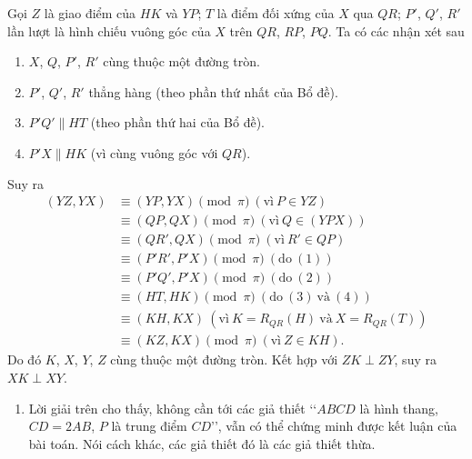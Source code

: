 \begin{bt}
{\begin{center}
		\end{center}
		Gọi $Z$ là giao điểm của $HK$ và $YP$; $T$ là điểm đối xứng của $X$ qua $QR$; $P'$, $Q'$, $R'$ lần lượt là hình chiếu vuông góc của $X$ trên $QR$, $RP$, $PQ$. Ta có các nhận xét sau
		\begin{enumerate}[(1)]
			\item $X$, $Q$, $P'$, $R'$ cùng thuộc một đường tròn.
			\item $P'$, $Q'$, $R'$ thẳng hàng (theo phần thứ nhất của Bổ đề).
			\item $P'Q'\parallel HT$ (theo phần thứ hai của Bổ đề).
			\item $P'X\parallel HK$ (vì cùng vuông góc với $QR$).
		\end{enumerate}
		Suy ra
		{
			\allowdisplaybreaks
			\begin{align*}
			(YZ,YX)&\equiv(YP,YX) \pmod{\pi}\ (\text{vì}\ P\in YZ)\\
			&\equiv (QP,QX) \pmod{\pi} \ (\text{vì}\ Q\in (YPX))\\
			&\equiv \left( QR',QX \right)\pmod{\pi} \ (\text{vì}\ R'\in QP)\\
			&\equiv \left( P'R',P'X \right) \pmod{\pi} \ (\text{do}\ (1))\\
			&\equiv \left( P'Q',P'X \right)\pmod{\pi}\ (\text{do}\ (2))\\
			&\equiv (HT,HK) \pmod{\pi} \ (\text{do}\ (3)\ \text{và}\ (4))\\
			&\equiv (KH,KX) \ (\text{vì}\ K=R_{QR}(H)\ \text{và}\ X=R_{QR}(T))\\
			&\equiv (KZ,KX) \pmod{\pi} \ (\text{vì}\ Z\in KH).
			\end{align*}
		}
		Do đó $K$, $X$, $Y$, $Z$ cùng thuộc một đường tròn. Kết hợp với $ZK\perp ZY$, suy ra $XK\perp XY$.
		\begin{nx}\hfill
			\begin{enumerate}
				\item Lời giải trên cho thấy, không cần tới các giả thiết \lq\lq $ABCD$ là hình thang, $CD=2AB$, $P$ là trung điểm $CD$\rq\rq, vẫn có thể chứng minh được kết luận của bài toán. Nói cách khác, các giả thiết đó là các giả thiết thừa.

\end{enumerate}
\end{nx}}
\end{bt}
